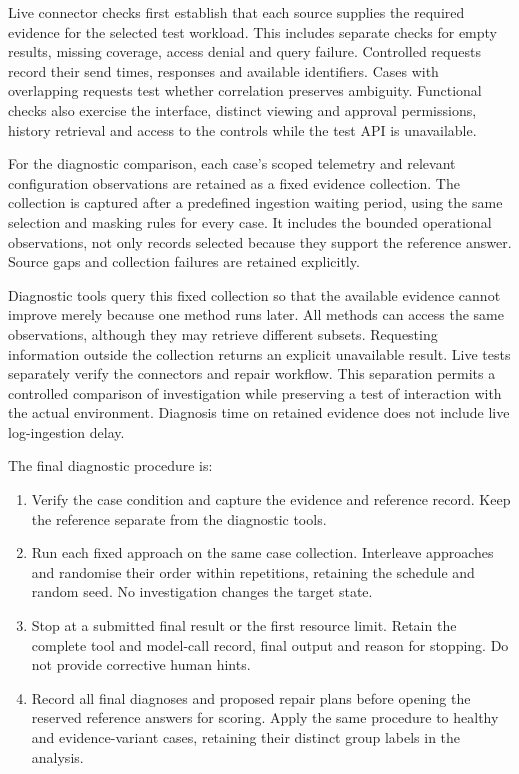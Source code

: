 Live connector checks first establish that each source supplies the
required evidence for the selected test workload. This includes separate
checks for empty results, missing coverage, access denial and query
failure. Controlled requests record their send times, responses and
available identifiers. Cases with overlapping requests test whether
correlation preserves ambiguity. Functional checks also exercise the
interface, distinct viewing and approval permissions, history retrieval
and access to the controls while the test API is unavailable.

For the diagnostic comparison, each case's scoped telemetry and relevant
configuration observations are retained as a fixed evidence collection.
The collection is captured after a predefined ingestion waiting period,
using the same selection and masking rules for every case. It includes
the bounded operational observations, not only records selected because
they support the reference answer. Source gaps and collection failures
are retained explicitly.

Diagnostic tools query this fixed collection so that the available
evidence cannot improve merely because one method runs later. All methods
can access the same observations, although they may retrieve different
subsets. Requesting information outside the collection returns an
explicit unavailable result. Live tests separately verify the connectors
and repair workflow. This separation permits a controlled comparison
of investigation while preserving a test of interaction with the actual
environment. Diagnosis time on retained evidence does not include live
log-ingestion delay.

The final diagnostic procedure is:

\begin{enumerate}
\item Verify the case condition and capture the evidence and reference
record. Keep the reference separate from the diagnostic tools.
\item Run each fixed approach on the same case collection. Interleave
approaches and randomise their order within repetitions, retaining the
schedule and random seed. No investigation changes the target state.
\item Stop at a submitted final result or the first resource limit.
Retain the complete tool and model-call record, final output and reason
for stopping. Do not provide corrective human hints.
\item Record all final diagnoses and proposed repair plans before opening
the reserved reference answers for scoring. Apply the same procedure to
healthy and evidence-variant cases, retaining their distinct group labels
in the analysis.
\end{enumerate}

